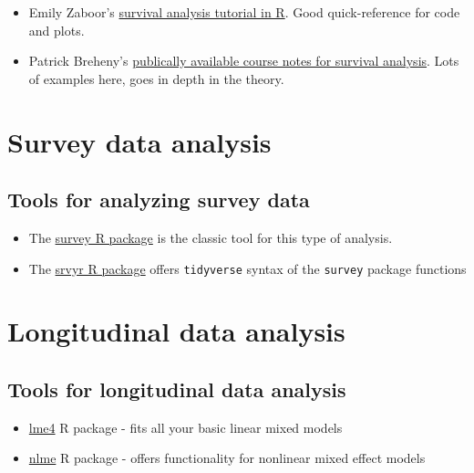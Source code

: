 \documentclass[
]{book}
\begin{document}
\begin{itemize}
\item
  Emily Zaboor's \href{https://www.emilyzabor.com/tutorials/survival_analysis_in_r_tutorial.html}{survival analysis tutorial in R}. Good quick-reference for code and plots.
\item
  Patrick Breheny's \href{https://myweb.uiowa.edu/pbreheny/7210/f19/index.html}{publically available course notes for survival analysis}. Lots of examples here, goes in depth in the theory.
\end{itemize}

\hypertarget{survey-data-analysis}{%
\chapter{Survey data analysis}\label{survey-data-analysis}}

\hypertarget{tools-for-analyzing-survey-data}{%
\section{Tools for analyzing survey data}\label{tools-for-analyzing-survey-data}}

\begin{itemize}
\item
  The \href{https://cran.r-project.org/web/packages/survey/index.html}{survey R package} is the classic tool for this type of analysis.
\item
  The \href{https://cran.r-project.org/web/packages/srvyr/vignettes/srvyr-vs-survey.html}{srvyr R package} offers \texttt{tidyverse} syntax of the \texttt{survey} package functions
\end{itemize}

\hypertarget{longitudinal-data-analysis}{%
\chapter{Longitudinal data analysis}\label{longitudinal-data-analysis}}

\hypertarget{tools-for-longitudinal-data-analysis}{%
\section{Tools for longitudinal data analysis}\label{tools-for-longitudinal-data-analysis}}

\begin{itemize}
\item
  \href{https://cran.r-project.org/web/packages/lme4/index.html}{lme4} R package - fits all your basic linear mixed models
\item
  \href{https://cran.r-project.org/web/packages/nlme/index.html}{nlme} R package - offers functionality for nonlinear mixed effect models
\end{itemize}
\end{document}
